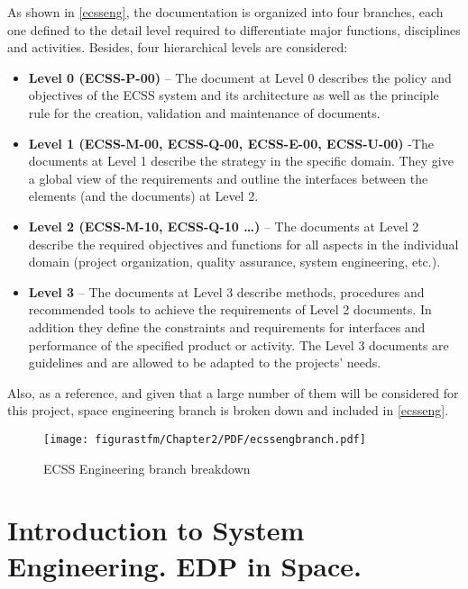 As shown in \autoref{ecsseng}, the documentation is organized into four branches, each one defined to the detail level required to differentiate major functions, disciplines and activities. Besides, four hierarchical levels are considered:

\begin{itemize}

\item{\textbf{Level 0 (ECSS-P-00)} – The document at Level 0 describes the policy and objectives of the ECSS system and its architecture as well as the principle rule for the creation, validation and maintenance of documents.}
\item{\textbf{Level 1 (ECSS-M-00, ECSS-Q-00, ECSS-E-00, ECSS-U-00)} -The documents at Level 1 describe the strategy in the specific domain. They give a global view of the requirements and outline the interfaces between the elements (and the documents) at Level 2.}
\item{\textbf{Level 2 (ECSS-M-10, ECSS-Q-10 …)} – The documents at Level 2 describe the required objectives and functions for all aspects in the individual domain (project organization, quality assurance, system engineering, etc.).}
\item{\textbf{Level 3} – The documents at Level 3 describe methods, procedures and recommended tools to achieve the requirements of Level 2 documents. In addition they define the constraints and requirements for interfaces and performance of the specified product or activity. The Level 3 documents are guidelines and are allowed to be adapted to the projects’ needs.}

\end{itemize}

Also, as a reference, and given that a large number of them will be considered for this project, space engineering branch is broken down and included in \autoref{ecsseng}.

\begin{landscape}
			\begin{figure}
				\centering
				\texttt{[image: figurastfm/Chapter2/PDF/ecssengbranch.pdf]}
				\caption{ECSS Engineering branch breakdown \cite{ecsstree}}
				\label{ecsseng}
			\end{figure}
\end{landscape}%




\section{Introduction to System Engineering. EDP in Space.}\label{engprocess}

